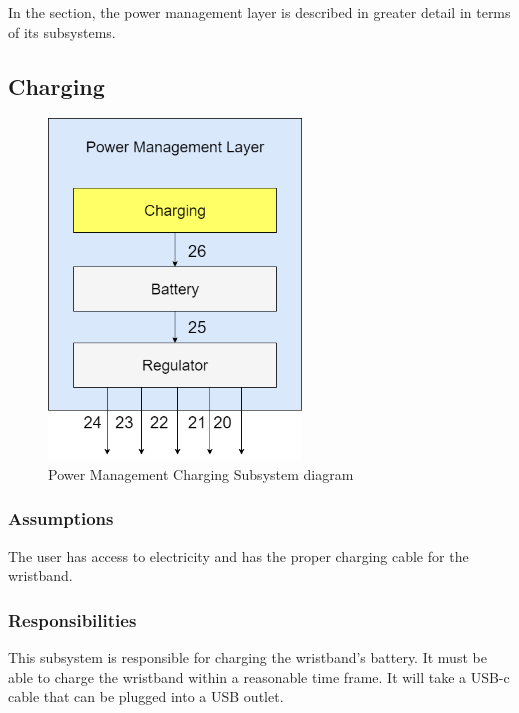 In the section, the power management layer is described in greater detail in terms of its subsystems.

\subsection{Charging}

\begin{figure}[h!]
	\centering
 	\includegraphics[width=0.60\textwidth]{images/PowerMgmtLayer_charging.drawio.png}
 \caption{Power Management Charging Subsystem diagram}
\end{figure}

\subsubsection{Assumptions}
The user has access to electricity and has the proper charging cable for the wristband.

\subsubsection{Responsibilities}
This subsystem is responsible for charging the wristband's battery. It must be able to charge the wristband within a reasonable time frame. It will take a USB-c cable that can be plugged into a USB outlet. 

